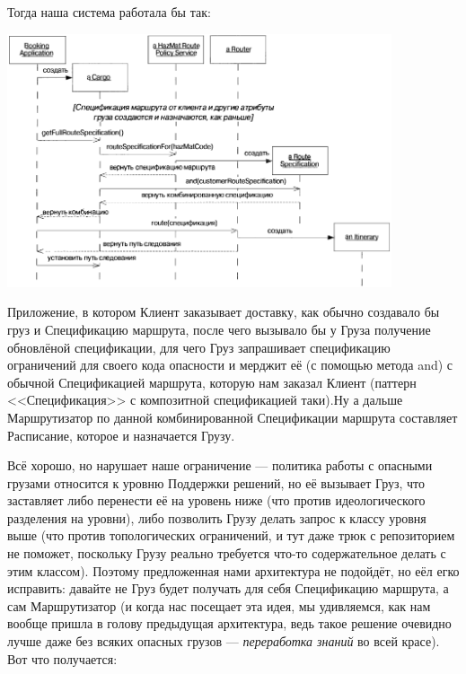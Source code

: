\documentclass[a5paper]{article}
\begin{document}
Тогда наша система работала бы так:

\begin{center}
    \includegraphics[width=0.85\textwidth]{cargoHazMatWrongSequence.png}
\end{center}

Приложение, в котором Клиент заказывает доставку, как обычно создавало бы груз и Спецификацию маршрута, после чего вызывало бы у Груза получение обновлёной спецификации, для чего Груз запрашивает спецификацию ограничений для своего кода опасности и мерджит её (с помощью метода and) с обычной Спецификацией маршрута, которую нам заказал Клиент (паттерн <<Спецификация>> с композитной спецификацией таки).Ну а дальше Маршрутизатор по данной комбинированной Спецификации маршрута составляет Расписание, которое и назначается Грузу.

Всё хорошо, но нарушает наше ограничение --- политика работы с опасными грузами относится к уровню Поддержки решений, но её вызывает Груз, что заставляет либо перенести её на уровень ниже (что против идеологического разделения на уровни), либо позволить Грузу делать запрос к классу уровня выше (что против топологических ограничений, и тут даже трюк с репозиторием не поможет, поскольку Грузу реально требуется что-то содержательное делать с этим классом). Поэтому предложенная нами архитектура не подойдёт, но еёл егко исправить: давайте не Груз будет получать для себя Спецификацию маршрута, а сам Маршрутизатор (и когда нас посещает эта идея, мы удивляемся, как нам вообще пришла в голову предыдущая архитектура, ведь такое решение очевидно лучше даже без всяких опасных грузов --- \textit{переработка знаний} во всей красе). Вот что получается:
\end{document}

